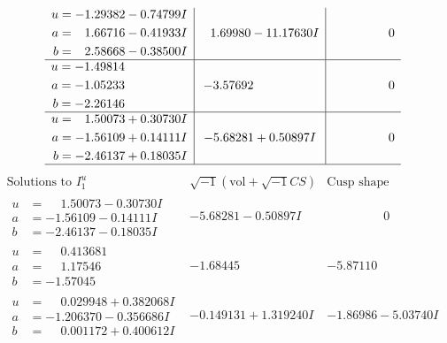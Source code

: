 \documentclass[1p]{elsarticle_modified}
\theoremstyle{definition}
\newcommand{\I}{\sqrt{-1}}
\begin{document}
$$\begin{array}{c|c|c}
\begin{aligned}
u &= -1.29382 - 0.74799 I \\
a &= \phantom{-}1.66716 - 0.41933 I \\
b &= \phantom{-}2.58668 - 0.38500 I\end{aligned}
 & \phantom{-}1.69980 - 11.17630 I & \phantom{-0.000000 } 0 \\ \hline\begin{aligned}
u &= -1.49814\phantom{ +0.000000I} \\
a &= -1.05233\phantom{ +0.000000I} \\
b &= -2.26146\phantom{ +0.000000I}\end{aligned}
 & -3.57692\phantom{ +0.000000I} & \phantom{-0.000000 } 0 \\ \hline\begin{aligned}
u &= \phantom{-}1.50073 + 0.30730 I \\
a &= -1.56109 + 0.14111 I \\
b &= -2.46137 + 0.18035 I\end{aligned}
 & -5.68281 + 0.50897 I & \phantom{-0.000000 } 0\\
 \hline 
 \end{array}$$\newpage$$\begin{array}{c|c|c}  
\text{Solutions to }I^u_{1}& \I (\text{vol} + \sqrt{-1}CS) & \text{Cusp shape}\\
 \hline 
\begin{aligned}
u &= \phantom{-}1.50073 - 0.30730 I \\
a &= -1.56109 - 0.14111 I \\
b &= -2.46137 - 0.18035 I\end{aligned}
 & -5.68281 - 0.50897 I & \phantom{-0.000000 } 0 \\ \hline\begin{aligned}
u &= \phantom{-}0.413681\phantom{ +0.000000I} \\
a &= \phantom{-}1.17546\phantom{ +0.000000I} \\
b &= -1.57045\phantom{ +0.000000I}\end{aligned}
 & -1.68445\phantom{ +0.000000I} & -5.87110\phantom{ +0.000000I} \\ \hline\begin{aligned}
u &= \phantom{-}0.029948 + 0.382068 I \\
a &= -1.206370 - 0.356686 I \\
b &= \phantom{-}0.001172 + 0.400612 I\end{aligned}
 & -0.149131 + 1.319240 I & -1.86986 - 5.03740 I \\ \hline\begin{aligned}

\end{aligned}
\end{array}$$
\end{document}
